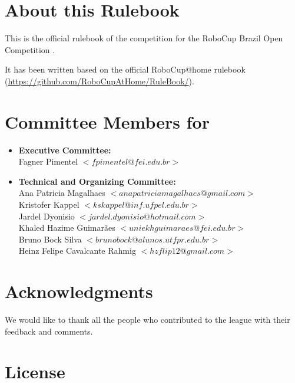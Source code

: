 

\section*{About this Rulebook}  
This is the official rulebook of the \AtHome{} competition for the RoboCup Brazil Open Competition \YEAR.

It has been written based on the official RoboCup@home rulebook (\url{https://github.com/RoboCupAtHome/RuleBook/}). 

\section*{Committee Members for \YEAR}
\begin{itemize}
    \item \textbf{Executive Committee:} \\ Fagner Pimentel $<fpimentel@fei.edu.br>$
    \item \textbf{Technical and Organizing Committee:} \\ 
    Ana Patricia Magalhaes $<anapatriciamagalhaes@gmail.com>$ \\
    Kristofer Kappel $<kskappel@inf.ufpel.edu.br>$ \\
    Jardel Dyonisio  $<jardel.dyonisio@hotmail.com>$ \\
    Khaled Hazime Guimarães $<uniekhguimaraes@fei.edu.br>$ \\
    Bruno Bock Silva $<brunobock@alunos.utfpr.edu.br>$ \\
    Heinz Felipe Cavalcante Rahmig $<hzflip12@gmail.com>$
\end{itemize}

\section*{Acknowledgments}
\label{sec:acknowledgments}

We would like to thank all the people who contributed to the \AtHome{} league with their feedback and comments.

\vfill

\section*{License}

\doclicenseThis

